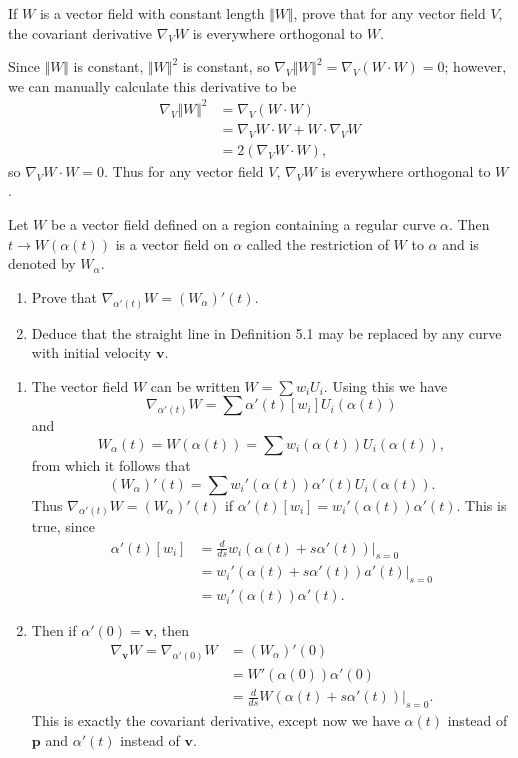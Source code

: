\documentclass[10pt]{report}
\begin{document}
\begin{exer}[2.5: 3]
	If $W$ is a vector field with constant length $\Vert{W}\Vert$, prove that for any vector field $V$, the covariant derivative $\nabla_{V}W$ is everywhere orthogonal to $W$.
\end{exer}
Since $\Vert{W}\Vert$ is constant, $\Vert{W}\Vert^2$ is constant, so $\nabla_{V}\Vert{W}\Vert^2 = \nabla_{V}(W \cdot W) =0$; however, we can manually calculate this derivative to be
\begin{align*}
	\nabla_{V}\Vert{W}\Vert^2 &= \nabla_{V}(W \cdot W) \\
				  &= \nabla_{V}W \cdot W + W \cdot \nabla_{V}W \\
			      &= 2(\nabla_{V}W \cdot W),
\end{align*}
so $\nabla_{V}W \cdot W=0$. Thus for any vector field $V$, $\nabla_{V}W$ is everywhere orthogonal to $W$.

\begin{exer}[2.5: 5]
	Let $W$ be a vector field defined on a region containing a regular curve $\alpha$. Then $t\to W(\alpha(t))$ is a vector field on $\alpha$ called the restriction of $W$ to $\alpha$ and is denoted by $W_{\alpha}$.
	\begin{enumerate}
		\item Prove that $\nabla_{\alpha'(t)}W=(W_{\alpha})'(t)$.
		\item Deduce that the straight line in Definition 5.1 may be replaced by any curve with initial velocity $\mathbf{v}$.
	\end{enumerate}
\end{exer}

\begin{enumerate}
	\item The vector field $W$ can be written $W = \sum w_i U_i$. Using this we have
		\[
			\nabla_{\alpha'(t)}W = \sum \alpha'(t)[w_i]U_i(\alpha(t))
		\] and
		\[
			W_{\alpha}(t) = W(\alpha(t)) = \sum w_i(\alpha(t)) U_i(\alpha(t)),
		\] from which it follows that
		\[
			(W_{\alpha})'(t) = \sum w_i'(\alpha(t))\alpha'(t) U_i(\alpha(t)).
		\] Thus $\nabla_{\alpha'(t)}W = (W_{\alpha})'(t)$ if $\alpha'(t)[w_i]=w_i'(\alpha(t))\alpha'(t)$. This is true, since
		\begin{align*}
			\alpha'(t)[w_i] &= \frac{d }{d s} w_i(\alpha(t)+s\alpha'(t))\Big|_{s=0}\\
					&= w_i'(\alpha(t)+s\alpha'(t))a'(t) \Big|_{s=0}\\
					&= w_i'(\alpha(t))\alpha'(t).
		\end{align*}

	\item Then if $\alpha'(0)=\mathbf{v}$, then
		\begin{align*}
			\nabla_{\mathbf{v}}W = \nabla_{\alpha'(0)}W &= (W_{\alpha})'(0)\\
			&=W'(\alpha(0))\alpha'(0) \\
			&= \frac{d }{d s} W(\alpha(t)+s\alpha'(t))\Big|_{s=0}.
		\end{align*}
		This is exactly the covariant derivative, except now we have $\alpha(t)$ instead of $\mathbf{p}$ and $\alpha'(t)$ instead of $\mathbf{v}$.
\end{enumerate}
\end{document}
